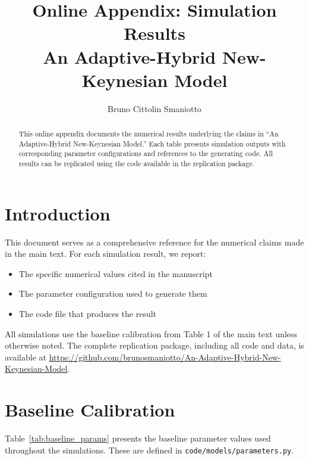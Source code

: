 \documentclass[11pt]{article}
\title{Online Appendix: Simulation Results\\[0.5em]
\large An Adaptive-Hybrid New-Keynesian Model}
\author{Bruno Cittolin Smaniotto}
\date{}
\begin{document}
\maketitle

\begin{abstract}
This online appendix documents the numerical results underlying the claims in ``An Adaptive-Hybrid New-Keynesian Model.'' Each table presents simulation outputs with corresponding parameter configurations and references to the generating code. All results can be replicated using the code available in the replication package.
\end{abstract}

\tableofcontents
\newpage

\section{Introduction}

This document serves as a comprehensive reference for the numerical claims made in the main text. For each simulation result, we report:
\begin{itemize}
    \item The specific numerical values cited in the manuscript
    \item The parameter configuration used to generate them
    \item The code file that produces the result
\end{itemize}

All simulations use the baseline calibration from Table 1 of the main text unless otherwise noted. The complete replication package, including all code and data, is available at \url{https://github.com/brunosmaniotto/An-Adaptive-Hybrid-New-Keynesian-Model}.

\section{Baseline Calibration}
\label{sec:calibration}

Table~\ref{tab:baseline_params} presents the baseline parameter values used throughout the simulations. These are defined in \texttt{code/models/parameters.py}.
\end{document}
